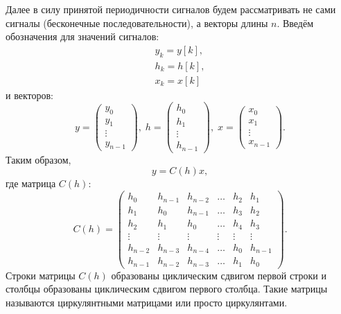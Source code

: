 Далее в силу принятой периодичности сигналов будем рассматривать не сами сигналы (бесконечные последовательности), а векторы длины $n$. Введём обозначения для значений сигналов:
\begin{gather*}
    y_k = y[k] , \\
    h_k = h[k] , \\
    x_k = x[k]
\end{gather*}
и векторов:
\[
    y
    = \begin{pmatrix}
        y_0    \\
        y_1    \\
        \vdots \\
        y_{n-1}
    \end{pmatrix}
    , \;
    h
    = \begin{pmatrix}
        h_0    \\
        h_1    \\
        \vdots \\
        h_{n-1}
    \end{pmatrix}
    , \;
    x
    = \begin{pmatrix}
        x_0    \\
        x_1    \\
        \vdots \\
        x_{n-1}
    \end{pmatrix}
    .
\]
Таким образом,
\begin{equation}
    \label{linear:transformation}
    y = C(h) x ,
\end{equation}
где матрица $C(h)$:
\begin{equation}
    \label{linear:circulant}
    C(h)
    = \begin{pmatrix}
        h_0     & h_{n-1} & h_{n-2} & \dots  & h_2    & h_1     \\
        h_1     & h_0     & h_{n-1} & \dots  & h_3    & h_2     \\
        h_2     & h_1     & h_{0}   & \dots  & h_4    & h_3     \\
        \vdots  & \vdots  & \vdots  & \vdots & \vdots & \vdots  \\
        h_{n-2} & h_{n-3} & h_{n-4} & \dots  & h_0    & h_{n-1} \\
        h_{n-1} & h_{n-2} & h_{n-3} & \dots  & h_1    & h_0
    \end{pmatrix}
    .
\end{equation}
Строки матрицы $C(h)$ образованы циклическим сдвигом первой строки и столбцы образованы циклическим сдвигом первого столбца. Такие матрицы называются циркулянтными матрицами или просто
циркулянтами.

